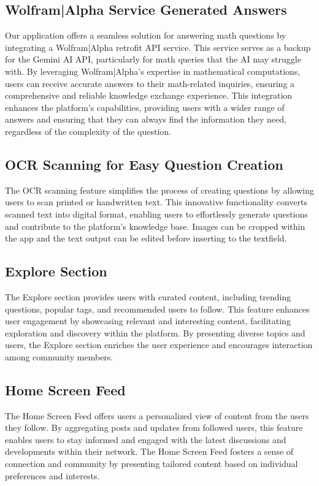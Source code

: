 \subsection{Wolfram|Alpha Service Generated Answers}

Our application offers a seamless solution for answering math questions by integrating a Wolfram|Alpha retrofit API service. This service serves as a backup for the Gemini AI API, particularly for math queries that the AI may struggle with. By leveraging Wolfram|Alpha's expertise in mathematical computations, users can receive accurate answers to their math-related inquiries, ensuring a comprehensive and reliable knowledge exchange experience. This integration enhances the platform's capabilities, providing users with a wider range of answers and ensuring that they can always find the information they need, regardless of the complexity of the question.

\subsection{OCR Scanning for Easy Question Creation}

The OCR scanning feature simplifies the process of creating questions by allowing users to scan printed or handwritten text. This innovative functionality converts scanned text into digital format, enabling users to effortlessly generate questions and contribute to the platform's knowledge base. Images can be cropped within the app and the text output can be edited before inserting to the textfield.

\subsection{Explore Section}

The Explore section provides users with curated content, including trending questions, popular tags, and recommended users to follow. This feature enhances user engagement by showcasing relevant and interesting content, facilitating exploration and discovery within the platform. By presenting diverse topics and users, the Explore section enriches the user experience and encourages interaction among community members.

\subsection{Home Screen Feed}

The Home Screen Feed offers users a personalized view of content from the users they follow. By aggregating posts and updates from followed users, this feature enables users to stay informed and engaged with the latest discussions and developments within their network. The Home Screen Feed fosters a sense of connection and community by presenting tailored content based on individual preferences and interests.

